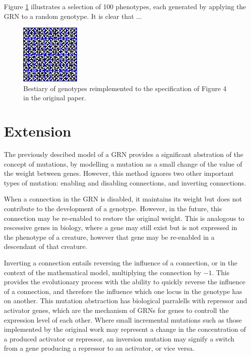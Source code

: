 \documentclass[twocolumn,a4paper,11pt]{article}
\begin{document}
    Figure \ref{fig:4b} illustrates a selection of 100 phenotypes, each generated by applying the GRN to a random genotype. It is clear that ...

    \begin{figure}[h]
        \centering
        \includegraphics[width=0.7\linewidth]{img/fig4b.png}
        \caption{Bestiary of genotypes reimplemented to the specification of Figure 4 in the original paper.} \label{fig:4b}
    \end{figure}

    \section{Extension}
    The previously descibed model of a GRN provides a significant abstration of the concept of mutations, by modelling a mutation as a small change of the value of the weight between genes. However, this method ignores two other important types of mutation: enabling and disabling connections, and inverting connections.

    When a connection in the GRN is disabled, it maintains its weight but does not contribute to the development of a genotype. However, in the future, this connection may be re-enabled to restore the original weight. This is analogous to rescessive genes in biology, where a gene may still exist but is not expressed in the phenotype of a creature, however that gene may be re-enabled in a descendant of that creature.
    
    Inverting a connection entails reversing the influence of a connection, or in the context of the mathematical model, multiplying the connection by $-1$. This provides the evolutionary process with the ability to quickly reverse the influence of a connection, and therefore the influence which one locus in the genotype has on another. This mutation abstraction has biological parralells with repressor and activator genes, which are the mechanism of GRNs for genes to controll the expression level of each other. Where small incremental mutations such as those implemented by the original work may represent a change in the concentration of a produced activator or repressor, an inversion mutation may signify a switch from a gene producing a repressor to an activator, or vice versa.
\end{document}
